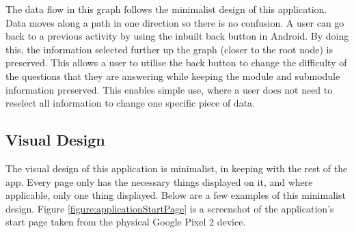 \documentclass{article}
\begin{document}

The data flow in this graph follows the minimalist design of this application. Data moves along a path in one direction so there is no confusion. A user can go back to a previous activity by using the inbuilt back button in Android. By doing this, the information selected further up the graph (closer to the root node) is preserved. This allows a user to utilise the back button to change the difficulty of the questions that they are answering while keeping the module and submodule information preserved. This enables simple use, where a user does not need to reselect all information to change one specific piece of data. \\

\subsection{Visual Design}

The visual design of this application is minimalist, in keeping with the rest of the app. Every page only has the necessary things displayed on it, and where applicable, only one thing displayed. Below are a few examples of this minimalist design. Figure \ref{figure:applicationStartPage} is a screenshot of the application's start page taken from the physical Google Pixel 2 device.
\end{document}
